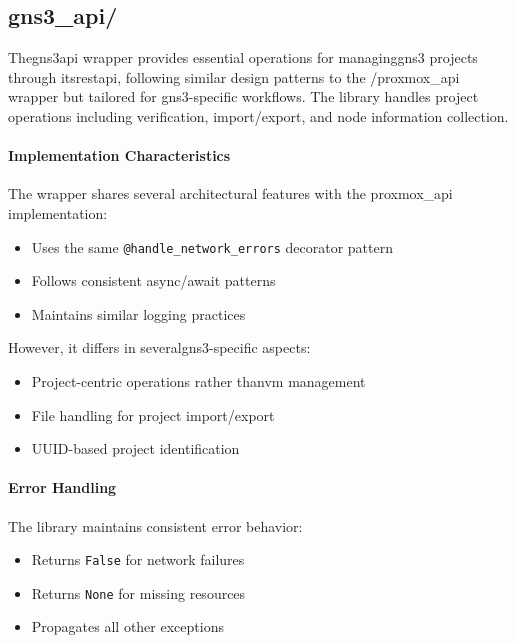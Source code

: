     \subsection{gns3\_api/}
        The\ac{gns3}\ac{api} wrapper provides essential operations for managing\ac{gns3} projects through 
        its\ac{rest}\ac{api}, following similar design patterns to the /proxmox\_api wrapper but tailored for
        \ac{gns3}-specific workflows. The library handles project operations including verification, import/export, 
        and node information collection.

        \paragraph{Implementation Characteristics}

        The wrapper shares several architectural features with the proxmox\_api implementation:

        \begin{itemize}
        \item Uses the same \texttt{@handle\_network\_errors} decorator pattern
        \item Follows consistent async/await patterns
        \item Maintains similar logging practices
        \end{itemize}

        However, it differs in several\ac{gns3}-specific aspects:

        \begin{itemize}
        \item Project-centric operations rather than\ac{vm} management
        \item File handling for project import/export
        \item UUID-based project identification
        \end{itemize}

        \paragraph{Error Handling}

        The library maintains consistent error behavior:

        \begin{itemize}
        \item Returns \texttt{False} for network failures
        \item Returns \texttt{None} for missing resources
        \item Propagates all other exceptions
        \end{itemize}

